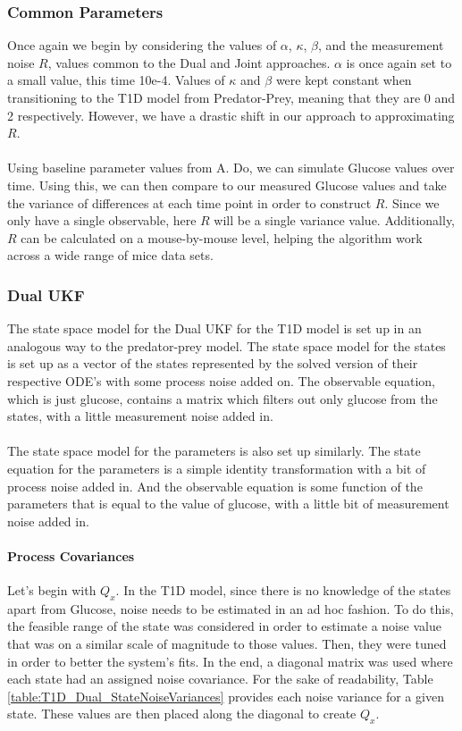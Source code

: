 \subsubsection{Common Parameters}
Once again we begin by considering the values of $\alpha$, $\kappa$, $\beta$, and the measurement noise $R$, values common to the Dual and Joint approaches. $\alpha$ is once again set to a small value, this time 10e-4. Values of $\kappa$ and $\beta$ were kept constant when transitioning to the T1D model from Predator-Prey, meaning that they are 0 and 2 respectively. However, we have a drastic shift in our approach to approximating $R$.\\
\\
Using baseline parameter values from A. Do, we can simulate Glucose values over time. Using this, we can then compare to our measured Glucose values and take the variance of differences at each time point in order to construct $R$. Since we only have a single observable, here $R$ will be a single variance value. Additionally, $R$ can be calculated on a mouse-by-mouse level, helping the algorithm work across a wide range of mice data sets.

\subsubsection{Dual UKF}
The state space model for the Dual UKF for the T1D model is set up in an analogous way to the predator-prey model. The state space model for the states is set up as a vector of the states represented by the solved version of their respective ODE's  with some process noise added on. The observable equation, which is just glucose, contains a matrix which filters out only glucose from the states, with a little measurement noise added in. \\
\\
The state space model for the parameters is also set up similarly. The state equation for the parameters is a simple identity transformation with a bit of process noise added in. And the observable equation is some function of the parameters that is equal to the value of glucose, with a little bit of measurement noise added in. 

\paragraph{Process Covariances}\label{section:T1D_Dual_ProcessCovariance}
Let's begin with $Q_x$. In the T1D model, since there is no knowledge of the states apart from Glucose, noise needs to be estimated in an ad hoc fashion. To do this, the feasible range of the state was considered in order to estimate a noise value that was on a similar scale of magnitude to those values. Then, they were tuned in order to better the system's fits. In the end, a diagonal matrix was used where each state had an assigned noise covariance. For the sake of readability, Table \ref{table:T1D_Dual_StateNoiseVariances} provides each noise variance for a given state. These values are then placed along the diagonal to create $Q_x$.

